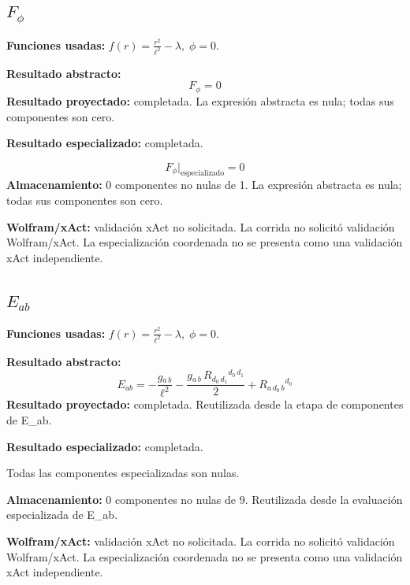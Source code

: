 \documentclass[11pt]{article}
\begin{document}
\subsection*{$ F_{\phi} $}
\textbf{Funciones usadas:} $ f\!\left(r\right) = \frac{{r}^{2}}{{\ell}^{2}} - \lambda,\;\phi=0 $.\par
\textbf{Resultado abstracto:}
\begin{dmath*}[breakdepth={5}]
F_{\phi} = 0
\end{dmath*}
\textbf{Resultado proyectado:} completada. La expresión abstracta es nula; todas sus componentes son cero.\par
\textbf{Resultado especializado:} completada.\par
\begin{dmath*}[breakdepth={5}]
F_{\phi}\big|_{\mathrm{especializado}} = 0
\end{dmath*}
\textbf{Almacenamiento:} 0 componentes no nulas de 1. La expresión abstracta es nula; todas sus componentes son cero.\par
\textbf{Wolfram/xAct:} validación xAct no solicitada. La corrida no solicitó validación Wolfram/xAct. La especialización coordenada no se presenta como una validación xAct independiente.\par\medskip
{}
\subsection*{$ E_{ab} $}
\textbf{Funciones usadas:} $ f\!\left(r\right) = \frac{{r}^{2}}{{\ell}^{2}} - \lambda,\;\phi=0 $.\par
\textbf{Resultado abstracto:}
\begin{dmath*}[breakdepth={5}]
E_{ab} = -\frac{g{}_{a\,b}}{{\ell}^{2}} - \frac{g{}_{a\,b}\,R{}_{d_{0}\,d_{1}}{}^{d_{0}\,d_{1}}}{2} + R{}_{a\,d_{0}\,b}{}^{d_{0}}
\end{dmath*}
\textbf{Resultado proyectado:} completada. Reutilizada desde la etapa de componentes de E\_ab.\par
\textbf{Resultado especializado:} completada.\par
Todas las componentes especializadas son nulas.\par
\textbf{Almacenamiento:} 0 componentes no nulas de 9. Reutilizada desde la evaluación especializada de E\_ab.\par
\textbf{Wolfram/xAct:} validación xAct no solicitada. La corrida no solicitó validación Wolfram/xAct. La especialización coordenada no se presenta como una validación xAct independiente.\par\medskip
{}
\end{document}
